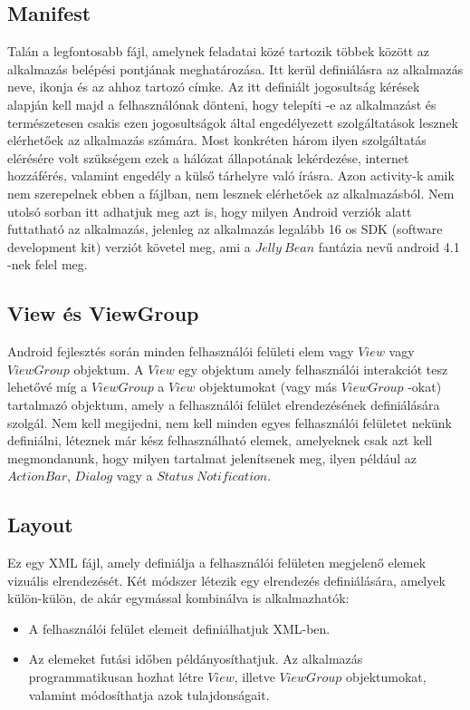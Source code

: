 \documentclass[12pt]{report}
\theoremstyle{definition}
\begin{document}
	\subsection*{Manifest}
	Talán a legfontosabb fájl, amelynek feladatai közé tartozik többek között az alkalmazás belépési pontjának meghatározása. Itt kerül definiálásra az alkalmazás neve, ikonja és az ahhoz tartozó címke. Az itt definiált jogosultság kérések alapján kell majd a felhasználónak dönteni, hogy telepíti -e az alkalmazást és természetesen csakis ezen jogosultságok által engedélyezett szolgáltatások lesznek elérhetőek az alkalmazás számára. Most konkréten három ilyen szolgáltatás elérésére volt szükségem ezek a hálózat állapotának lekérdezése, internet hozzáférés, valamint engedély a külső tárhelyre való írásra. Azon activity-k amik nem szerepelnek ebben a fájlban, nem lesznek elérhetőek az alkalmazásból. Nem utolsó sorban itt adhatjuk meg azt is, hogy milyen Android verziók alatt futtatható az alkalmazás, jelenleg az alkalmazás legalább 16 os SDK (software development kit) verziót követel meg, ami a $Jelly\ Bean$ fantázia nevű android 4.1 -nek felel meg.
	
	\subsection*{View és ViewGroup}
	Android fejlesztés során minden felhasználói felületi elem vagy $View$ vagy $ViewGroup$ objektum. A $View$ egy objektum amely felhasználói interakciót tesz lehetővé míg a \linebreak$ViewGroup$ a $View$ objektumokat (vagy más $ViewGroup$ -okat) tartalmazó objektum, amely a felhasználói felület elrendezésének definiálására szolgál. Nem kell megijedni, nem kell minden egyes felhasználói felületet nekünk definiálni, léteznek már kész felhasználható elemek, amelyeknek csak azt kell megmondanunk, hogy milyen tartalmat jelenítsenek meg, ilyen például az $ActionBar$, $Dialog$ vagy a $Status\ Notification$.
	
	\subsection*{Layout}
	Ez egy XML fájl, amely definiálja a felhasználói felületen megjelenő elemek vizuális elrendezését. Két módszer létezik egy elrendezés definiálására, amelyek külön-külön, de akár egymással kombinálva is alkalmazhatók:
	
	\begin{itemize}
		\item A felhasználói felület elemeit definiálhatjuk XML-ben.
		\item Az elemeket futási időben példányosíthatjuk. Az alkalmazás programmatikusan hozhat létre $View$, illetve $ViewGroup$ objektumokat, valamint módosíthatja azok tulajdonságait.
	\end{itemize}
	
\end{document}
